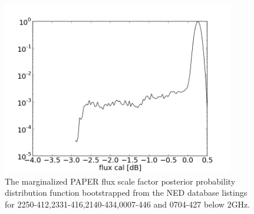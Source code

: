 \documentclass[preprint]{aastex}
\begin{document}
\begin{figure}
\centering
\includegraphics[width=0.9\textwidth]{plots/1526-423_2250-412_2331-416_1932-464_1421-490_gain_mcmc_chain_gain_conf.png}
\caption{
The marginalized PAPER flux scale factor posterior probability distribution
function bootstrapped from the NED database listings for
2250-412,2331-416,2140-434,0007-446 and 0704-427 below 2GHz.
\label{fig:gain}}
\end{figure}
\end{document}

